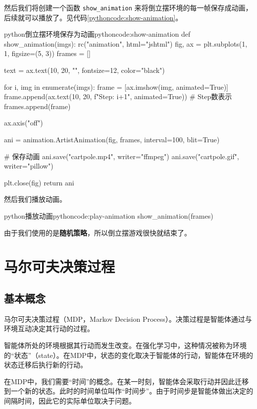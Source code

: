 \documentclass[lang=cn,newtx,10pt,scheme=chinese]{elegantbook}
\newcommand{\py}[1]{%
  \colorbox{gray!10}{\texttt{#1}}%
}
\begin{document}
然后我们将创建一个函数\py{show_animation}来将倒立摆环境的每一帧保存成动画，后续就可以播放了。见代码\ref{pythoncode:show-animation}。

\begin{codebox}{python}{倒立摆环境保存为动画}{pythoncode:show-animation}
def show_animation(imgs):
    rc("animation", html="jshtml")
    fig, ax = plt.subplots(1, 1, figsize=(5, 3))
    frames = []

    text = ax.text(10, 20, "", fontsize=12, color="black")

    for i, img in enumerate(imgs):
        frame = [ax.imshow(img, animated=True)]
        frame.append(ax.text(10, 20, f"Step: {i+1}", animated=True))  # Step数表示
        frames.append(frame)

    ax.axis("off")

    ani = animation.ArtistAnimation(fig, frames, interval=100, blit=True)

    # 保存动画
    ani.save("cartpole.mp4", writer="ffmpeg")
    ani.save("cartpole.gif", writer="pillow")

    plt.close(fig)
    return ani
\end{codebox}

然后我们播放动画。

\begin{codebox}{python}{播放动画}{pythoncode:play-animation}
show_animation(frames)
\end{codebox}

由于我们使用的是\textbf{随机策略}，所以倒立摆游戏很快就结束了。

\section{马尔可夫决策过程}

\subsection{基本概念}

马尔可夫决策过程（MDP，Markov Decision Process）。决策过程是智能体通过与环境互动决定其行动的过程。

智能体所处的环境根据其行动而发生改变。在强化学习中，这种情况被称为环境的``状态''（state）。在MDP中，状态的变化取决于智能体的行动，智能体在环境的状态迁移后执行新的行动。

在MDP中，我们需要``时间''的概念。在某一时刻，智能体会采取行动并因此迁移到一个新的状态。此时的时间单位叫作``时间步''。由于时间步是智能体做出决定的间隔时间，因此它的实际单位取决于问题。
\end{document}
